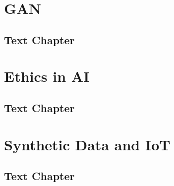 \documentclass[11pt,fleqn]{book} %
\begin{document}


\part{GAN}



\chapter{Text Chapter}



\part{Ethics in AI}



\chapter{Text Chapter}



\part{Synthetic Data and IoT}



\chapter{Text Chapter}
\end{document}
